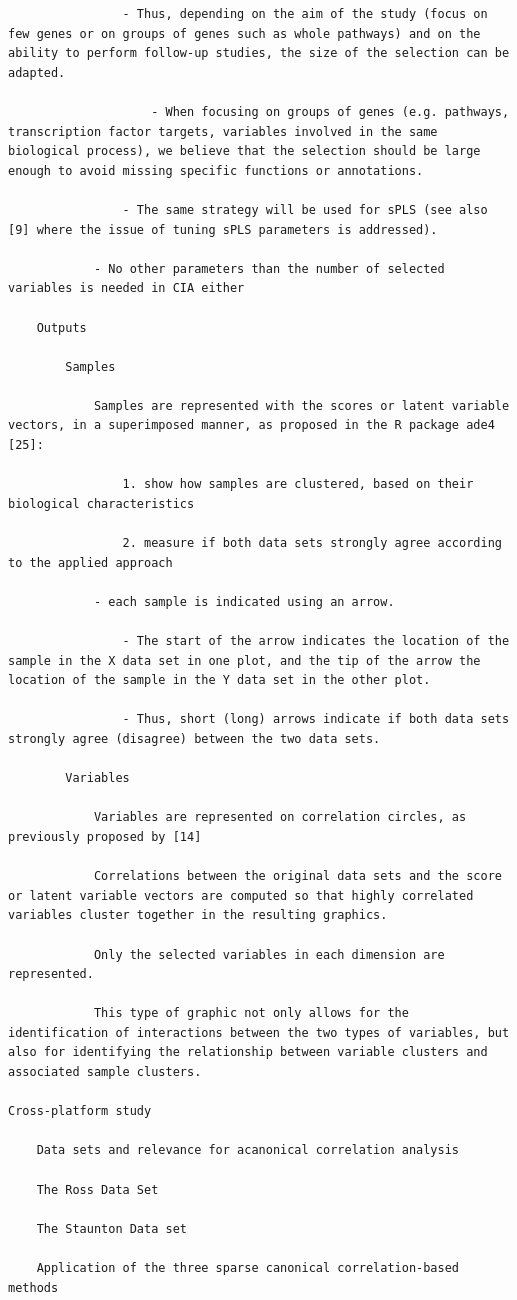 \documentclass[
]{book}
\begin{document}
\begin{verbatim}
                - Thus, depending on the aim of the study (focus on few genes or on groups of genes such as whole pathways) and on the ability to perform follow-up studies, the size of the selection can be adapted.

                    - When focusing on groups of genes (e.g. pathways, transcription factor targets, variables involved in the same biological process), we believe that the selection should be large enough to avoid missing specific functions or annotations.

                - The same strategy will be used for sPLS (see also [9] where the issue of tuning sPLS parameters is addressed).

            - No other parameters than the number of selected variables is needed in CIA either

    Outputs

        Samples

            Samples are represented with the scores or latent variable vectors, in a superimposed manner, as proposed in the R package ade4 [25]:

                1. show how samples are clustered, based on their biological characteristics

                2. measure if both data sets strongly agree according to the applied approach

            - each sample is indicated using an arrow.

                - The start of the arrow indicates the location of the sample in the X data set in one plot, and the tip of the arrow the location of the sample in the Y data set in the other plot.

                - Thus, short (long) arrows indicate if both data sets strongly agree (disagree) between the two data sets.

        Variables

            Variables are represented on correlation circles, as previously proposed by [14]

            Correlations between the original data sets and the score or latent variable vectors are computed so that highly correlated variables cluster together in the resulting graphics.

            Only the selected variables in each dimension are represented.

            This type of graphic not only allows for the identification of interactions between the two types of variables, but also for identifying the relationship between variable clusters and associated sample clusters.

Cross-platform study

    Data sets and relevance for acanonical correlation analysis

    The Ross Data Set

    The Staunton Data set

    Application of the three sparse canonical correlation-based methods
\end{verbatim}
\end{document}
